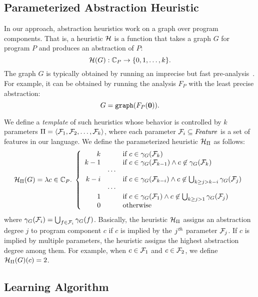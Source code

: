 \subsection{Parameterized Abstraction Heuristic}\label{sec:param-heuristic}

In our approach, abstraction heuristics work on a graph over program components.
That is, a heuristic $\mathcal{H}$ is a function that takes a graph $G$ for program $P$ and produces an abstraction of $P$:
\[
\mathcal{H}(G): \mathbb{C}_P \to \{0,1,\dots,k\}.
\]
The graph $G$ is typically obtained by running an imprecise but fast pre-analysis~\cite{TanLX16,Li2018b,Tan2017,Lu2019}. For example,
it can be obtained by running the analysis $F_P$ with the least precise abstraction:
\[
G = {\tt graph}(F_P({\bf 0})).
\]

We define a {\em template} of such heuristics whose behavior is controlled by $k$ parameters $\Pi = \langle \mathcal{F}_1, \mathcal{F}_2, \dots, \mathcal{F}_k \rangle$, where each parameter $\mathcal{F}_i \subseteq {{\it Feature}}$ is a set of features in our language.
We define the parameterized heuristic $\mathcal{H}_\Pi$ as follows:
\[
\mathcal{H}_{\Pi} (G) = \lambda c \in \mathbb{C}_P.\; \left\{
\begin{array}{rcl}
k & & \mbox{if}~c \in \gamma_G(\mathcal{F}_k) \\
k-1 & & \mbox{if}~c \in \gamma_G(\mathcal{F}_{k-1}) \land c \not\in \gamma_G(\mathcal{F}_k) \\
& \cdots& \\
k- i & & \mbox{if}~c \in \gamma_G({\mathcal{F}_{k-i}}) \land c \not\in \bigcup_{k \ge j > k-i}  \gamma_G({\mathcal{F}_j}) \\
& \cdots & \\
1 & & \mbox{if}~c \in \gamma_G(\mathcal{F}_1) \land c\not\in \bigcup_{k \ge j > 1}\gamma_G(\mathcal{F}_j) \\
0 & & \mbox{otherwise}
\end{array}
\right.
\]
where $\gamma_G(\mathcal{F}_i) = \bigcup_{f \in \mathcal{F}_i} \gamma_G(f)$.
Basically, the heuristic $\mathcal{H}_{\Pi}$ assigns an abstraction degree $j$ to program component $c$ if $c$ is implied by the $j^{\it th}$ parameter $\mathcal{F}_j$. If $c$ is implied by multiple parameters, the heuristic assigns the highest abstraction degree among them. For example,  when $c \in \mathcal{F}_1$ and $c \in \mathcal{F}_2$, we define $\mathcal{H}_{\Pi}(G)(c) = 2$.






\subsection{Learning Algorithm}\label{sec:learning-algorithm}

